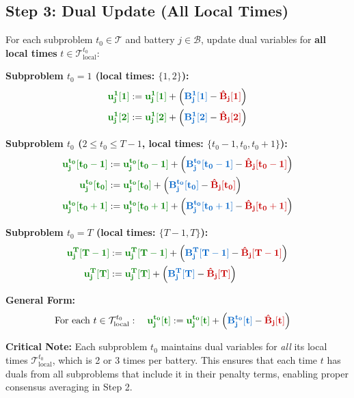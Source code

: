 \documentclass[11pt]{article}
\newcommand{\blueB}[1]{\textcolor{bluevar}{\mathbf{#1}}}      %
\newcommand{\redBhat}[1]{\textcolor{redvar}{\mathbf{#1}}}     %
\newcommand{\greenu}[1]{\textcolor{greenvar}{\mathbf{#1}}}    %
\begin{document}
\subsection{Step 3: Dual Update (All Local Times)}

For each subproblem $t_0 \in \mathcal{T}$ and battery $j \in \mathcal{B}$, update dual variables for \textbf{all local times} $t \in \mathcal{T}_{\text{local}}^{t_0}$:

\noindent\textbf{Subproblem $t_0=1$ (local times: $\{1, 2\}$):}
\begin{align}
\greenu{u_j^{1}[1]} &:= \greenu{u_j^{1}[1]} + \left( \blueB{B_j^{1}[1]} - \redBhat{\hat{B}_j[1]} \right) \\
\greenu{u_j^{1}[2]} &:= \greenu{u_j^{1}[2]} + \left( \blueB{B_j^{1}[2]} - \redBhat{\hat{B}_j[2]} \right)
\end{align}

\noindent\textbf{Subproblem $t_0$ ($2 \leq t_0 \leq T-1$, local times: $\{t_0-1, t_0, t_0+1\}$):}
\begin{align}
\greenu{u_j^{t_0}[t_0-1]} &:= \greenu{u_j^{t_0}[t_0-1]} + \left( \blueB{B_j^{t_0}[t_0-1]} - \redBhat{\hat{B}_j[t_0-1]} \right) \\
\greenu{u_j^{t_0}[t_0]} &:= \greenu{u_j^{t_0}[t_0]} + \left( \blueB{B_j^{t_0}[t_0]} - \redBhat{\hat{B}_j[t_0]} \right) \\
\greenu{u_j^{t_0}[t_0+1]} &:= \greenu{u_j^{t_0}[t_0+1]} + \left( \blueB{B_j^{t_0}[t_0+1]} - \redBhat{\hat{B}_j[t_0+1]} \right)
\end{align}

\noindent\textbf{Subproblem $t_0=T$ (local times: $\{T-1, T\}$):}
\begin{align}
\greenu{u_j^{T}[T-1]} &:= \greenu{u_j^{T}[T-1]} + \left( \blueB{B_j^{T}[T-1]} - \redBhat{\hat{B}_j[T-1]} \right) \\
\greenu{u_j^{T}[T]} &:= \greenu{u_j^{T}[T]} + \left( \blueB{B_j^{T}[T]} - \redBhat{\hat{B}_j[T]} \right)
\end{align}

\textbf{General Form:}
\begin{align}
\text{For each } t \in \mathcal{T}_{\text{local}}^{t_0}: \quad \greenu{u_j^{t_0}[t]} &:= \greenu{u_j^{t_0}[t]} + \left( \blueB{B_j^{t_0}[t]} - \redBhat{\hat{B}_j[t]} \right)
\end{align}

\textbf{Critical Note:} Each subproblem $t_0$ maintains dual variables for \textit{all} its local times $\mathcal{T}_{\text{local}}^{t_0}$, which is 2 or 3 times per battery. This ensures that each time $t$ has duals from all subproblems that include it in their penalty terms, enabling proper consensus averaging in Step 2.
\end{document}
